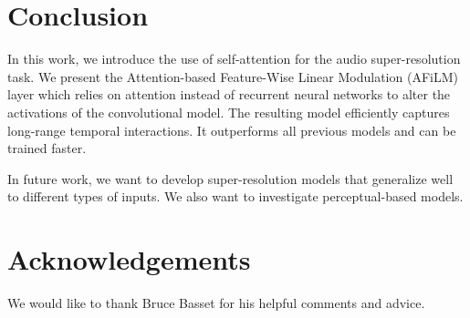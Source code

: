 \documentclass{article}
\begin{document}
\section{Conclusion}
\label{sec:conclusion}
In this work, we introduce the use of self-attention for the audio super-resolution task. We present the Attention-based Feature-Wise Linear Modulation (AFiLM) layer which relies on attention instead of recurrent neural networks to alter the activations of the convolutional model. The resulting model efficiently captures long-range temporal interactions. It outperforms all previous models and can be trained faster.

In future work, we want to develop super-resolution models that generalize well to different types of inputs. We also want to investigate perceptual-based models.

\section{Acknowledgements}
We would like to thank Bruce Basset for his helpful comments and advice.



\end{document}
